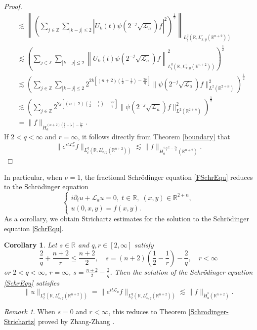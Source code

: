 \documentclass[a4paper,11pt, reqno]{amsart}
\numberwithin{equation}{section}
\theoremstyle{plain}
\newtheorem{corollary}[theorem]{Corollary}
\theoremstyle{definition}
\theoremstyle{remark}
\newtheorem{remark}[theorem]{Remark}
\begin{document}
\begin{proof}
\begin{align*}
&\lesssim \left\|\left(\sum_{j\in\mathbb{Z}}\sum_{|k-j|\leq 2}|U_k(t)\psi(2^{-j}\sqrt{\mathcal{L}_a})f|^2\right)^\frac{1}{2}\right\|_{L_t^q(\mathbb{R},L^r_{x,y}(\mathbb{R}^{n+2}))}\\
&\lesssim \left(\sum_{j\in\mathbb{Z}}\sum_{|k-j|\leq 2}\left\|U_k(t)\psi(2^{-j}\sqrt{\mathcal{L}_a})f\right\|_{L_t^q(\mathbb{R},L^r_{x,y}(\mathbb{R}^{n+2}))}^2\right)^\frac{1}{2}\\
&\lesssim \left(\sum_{j\in\mathbb{Z}}\sum_{|k-j|\leq 2}2^{2k[(n+2)(\frac{1}{2}-\frac{1}{r})-\frac{2\nu}{q}]}\|\psi(2^{-j}\sqrt{\mathcal{L}_a})f\|^2_{L^2(\mathbb{R}^{2+n})}\right)^\frac{1}{2}\\
&\lesssim \left(\sum_{j\in\mathbb{Z}}2^{2j[(n+2)(\frac{1}{2}-\frac{1}{r})-\frac{2\nu}{q}]}\|\psi(2^{-j}\sqrt{\mathcal{L}_a})f\|^2_{L^2(\mathbb{R}^{2+n})}\right)^\frac{1}{2}\\
&=\|f\|_{\dot{H}_a^{(n+2)(\frac{1}{2}-\frac{1}{r})-\frac{2\nu}{q}}}.
\end{align*}
If $2<q<\infty$ and $r=\infty$, it follows directly from Theorem \ref{boundary} that
\begin{equation*}
\|e^{it\mathcal{L}_a^\nu}f\|_{L_t^q(\mathbb{R},L^r_{x,y}(\mathbb{R}^{n+2}))}\lesssim \|f\|_{\dot{H}^{\frac{n+2}{2}-\frac{2\nu}{q}}_a(\mathbb{R}^{n+2})}.
\end{equation*}
\end{proof}
In particular, when $\nu=1$, the fractional Schr\"{o}dinger equation \eqref{FSchrEqu} reduces to the Schr\"odinger equation 
\begin{equation}\label{SchrEqu}
	\begin{cases}
	i\partial_tu+\mathcal{L}_au=0,\;t\in\mathbb{R},\; (x,y)\in\mathbb{R}^{2+n},\\
	u(0,x,y)=f(x,y).
	\end{cases}
	\end{equation}
As a corollary, we obtain Strichartz estimates for the solution to the Schr\"odinger equation \eqref{SchrEqu}.
\begin{corollary} Let $s\in\mathbb{R}$ and $q,r\in [2,\infty]$ satisfy
\begin{equation*}
\frac{2}{q}+\frac{n+2}{r}\leq \frac{n+2}{2},\quad s=(n+2)\left(\frac{1}{2}-\frac{1}{r}\right)-\frac{2}{q}, \quad r<\infty
\end{equation*}
or $2<q<\infty$, $r=\infty$, $s=\frac{n+2}{2}-\frac{2}{q}$. Then the solution of the Schr\"odinger equation \eqref{SchrEqu} satisfies
\begin{equation*}
\|u\|_{L_t^q(\mathbb{R},L^r_{x,y}(\mathbb{R}^{n+2}))}=\|e^{it\mathcal{L}_a}f\|_{L_t^q(\mathbb{R},L^r_{x,y}(\mathbb{R}^{n+2}))}\lesssim \|f\|_{\dot{H}^s_a(\mathbb{R}^{n+2})}.
\end{equation*}
\end{corollary}
\begin{remark} When $s=0$ and $r<\infty$, this reduces to Theorem \ref{Schrodinger-Strichartz} proved by Zhang-Zhang \cite{Zhang-Zhang}.
\end{remark}
\end{document}
